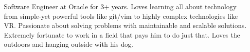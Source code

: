 

\begin{cvparagraph}

Software Engineer at Oracle for 3+ years.
Loves learning all about technology from simple-yet powerful tools like git/vim to highly complex technologies like VR.
Passionate about solving problems with maintainable and scalable solutions. Extremely fortunate to work in a field that pays him to do just that.
Loves the outdoors and hanging outside with his dog.
\end{cvparagraph}
